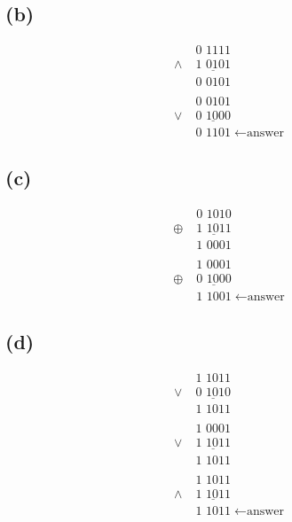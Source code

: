 \documentclass{article}
\begin{document}
\subsection{(b)}
\begin{align*}
	         & \text{0 1111}                             \\
	\land \; & \underline{\text{1 0101}}                 \\
	         & \text{0 0101}                             \\
	         &                                           \\
	         & \text{0 0101}                             \\
	\lor \;  & \underline{\text{0 1000}}                 \\
	         & \text{0 1101} \; \leftarrow \text{answer}
\end{align*}

\subsection{(c)}
\begin{align*}
	          & \text{0 1010}                             \\
	\oplus \; & \underline{\text{1 1011}}                 \\
	          & \text{1 0001}                             \\
	          &                                           \\
	          & \text{1 0001}                             \\
	\oplus \; & \underline{\text{0 1000}}                 \\
	          & \text{1 1001} \; \leftarrow \text{answer}
\end{align*}

\subsection{(d)}
\begin{align*}
	         & \text{1 1011}                             \\
	\lor \;  & \underline{\text{0 1010}}                 \\
	         & \text{1 1011}                             \\
	         &                                           \\
	         & \text{1 0001}                             \\
	\lor \;  & \underline{\text{1 1011}}                 \\
	         & \text{1 1011}                             \\
	         &                                           \\
	         & \text{1 1011}                             \\
	\land \; & \underline{\text{1 1011}}                 \\
	         & \text{1 1011} \; \leftarrow \text{answer}
\end{align*}
\end{document}
